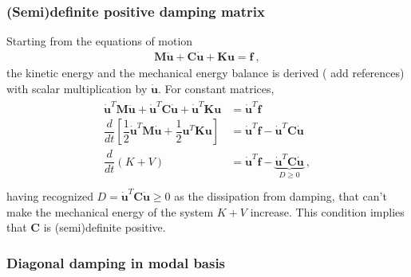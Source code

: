 \documentclass[letterpaper,10pt,english]{jupyterBook}
\begin{document}
\subsubsection*{(Semi)definite positive damping matrix}

\sphinxAtStartPar
Starting from the equations of motion
\begin{equation*}
\begin{split}\mathbf{M} \ddot{\mathbf{u}} + \mathbf{C} \dot{\mathbf{u}} + \mathbf{K} \mathbf{u} = \mathbf{f} \ ,\end{split}
\end{equation*}
\sphinxAtStartPar
the kinetic energy and the mechanical energy balance is derived ( add references) with scalar multiplication by \(\dot{\mathbf{u}}\). For constant matrices,
\begin{equation}\label{equation:ch/solids/structural-damping:eq:damping:second-principle-of-td}
\begin{split}\begin{aligned}
 \dot{\mathbf{u}}^T \mathbf{M} \ddot{\mathbf{u}} + \dot{\mathbf{u}}^T \mathbf{C} \dot{\mathbf{u}} + \dot{\mathbf{u}}^T \mathbf{K} \mathbf{u} & = \dot{\mathbf{u}}^T \mathbf{f} \\
 \dfrac{d}{dt} \left[ \dfrac{1}{2} \dot{\mathbf{u}}^T \mathbf{M} \dot{\mathbf{u}} + \dfrac{1}{2} \mathbf{u}^T \mathbf{K} \mathbf{u} \right] & = \dot{\mathbf{u}}^T \mathbf{f} - \dot{\mathbf{u}}^T \mathbf{C} \dot{\mathbf{u}}  \\
 \dfrac{d}{dt} \left( K + V \right) & = \dot{\mathbf{u}}^T \mathbf{f} - \underbrace{\dot{\mathbf{u}}^T \mathbf{C} \dot{\mathbf{u}}}_{ D \ge 0} \ , \\
\end{aligned}\end{split}
\end{equation}
\sphinxAtStartPar
having recognized \(D = \dot{\mathbf{u}}^T \mathbf{C} \dot{\mathbf{u}} \ge 0\) as the dissipation from damping, that can’t make the mechanical energy of the system \(K + V\) increase. This condition implies that \(\mathbf{C}\) is (semi)definite positive.
\subsubsection*{Diagonal damping in modal basis}
\end{document}
